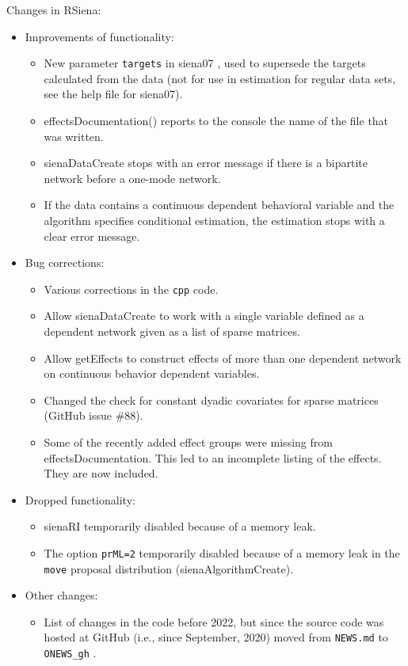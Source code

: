 \documentclass[a4paper,fleqn,11pt]{article}
\newcommand{\+}{\, + \,}
\newcommand{\sfn}[1]{\textsf{#1}}
\begin{document}
\begin{small}
\begin{itemize}
Changes in RSiena:
\begin{itemize}
\item Improvements of functionality:
   \begin{itemize}
  \item New parameter \texttt{targets}  in \sfn{siena07} , used to supersede the targets
    calculated from the data (not for use in estimation for regular data sets,
    see the help file for \sfn{siena07}).
  \item \sfn{effectsDocumentation()}  reports to the console
    the name of the file that was written.
  \item \sfn{sienaDataCreate}  stops with an error message if there is a bipartite
    network before a one-mode network.
  \item If the data contains a continuous dependent behavioral variable and
    the algorithm specifies conditional estimation, the estimation stops
    with a clear error message.
    \end{itemize}
\item Bug corrections:
   \begin{itemize}
   \item Various corrections in the \texttt{cpp} code.
  \item Allow \sfn{sienaDataCreate}  to work with a single variable defined as
    a dependent network given as a list of sparse matrices.
  \item Allow \sfn{getEffects}  to construct effects of more than one dependent network
    on continuous behavior dependent variables.
  \item Changed the check for constant dyadic covariates for
  sparse matrices (GitHub issue \#88).
  \item Some of the recently added effect groups were missing from
    \sfn{effectsDocumentation}. This led to an incomplete listing of the effects.
    They are now included.
  \end{itemize}
\item Dropped functionality:
   \begin{itemize}
  \item \sfn{sienaRI}  temporarily disabled because of a memory leak.
  \item The option \texttt{prML=2}  temporarily disabled because of a memory leak in the
    \texttt{move}  proposal distribution (\sfn{sienaAlgorithmCreate}).
  \end{itemize}
\item Other changes:
   \begin{itemize}
  \item List of changes in the code before 2022, but since the source
  code was hosted at GitHub (i.e., since September, 2020) moved from
  \texttt{NEWS.md}  to \texttt{ONEWS\_gh} .
  \end{itemize}
\end{itemize}



\end{itemize}
\end{small}
\end{document}
